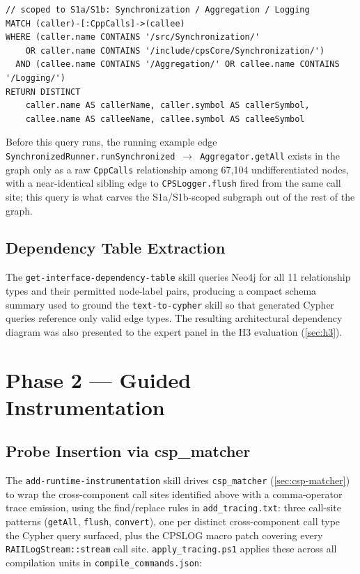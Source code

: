 \begin{verbatim}
// scoped to S1a/S1b: Synchronization / Aggregation / Logging
MATCH (caller)-[:CppCalls]->(callee)
WHERE (caller.name CONTAINS '/src/Synchronization/'
    OR caller.name CONTAINS '/include/cpsCore/Synchronization/')
  AND (callee.name CONTAINS '/Aggregation/' OR callee.name CONTAINS '/Logging/')
RETURN DISTINCT
    caller.name AS callerName, caller.symbol AS callerSymbol,
    callee.name AS calleeName, callee.symbol AS calleeSymbol
\end{verbatim}

Before this query runs, the running example edge
\texttt{SynchronizedRunner.runSynchronized}~$\to$~\texttt{Aggregator.getAll}
exists in the graph only as a raw \texttt{CppCalls} relationship among
67,104 undifferentiated nodes, with a near-identical sibling edge to
\texttt{CPSLogger.flush} fired from the same call site; this query is
what carves the S1a/S1b-scoped subgraph out of the rest of the graph.

\subsection{Dependency Table Extraction}\label{sec:idt}

The \texttt{get-interface-dependency-table} skill queries Neo4j for all
11 relationship types and their permitted node-label pairs, producing a
compact schema summary used to ground the \texttt{text-to-cypher} skill
so that generated Cypher queries reference only valid edge types. The
resulting architectural dependency diagram was also presented to the
expert panel in the H3 evaluation (\cref{sec:h3}).

\section{Phase 2 --- Guided Instrumentation}\label{sec:trace-impl}

\subsection{Probe Insertion via csp\_matcher}\label{sec:trace-probe-insertion}

The \texttt{add-runtime-instrumentation} skill drives \texttt{csp\_matcher}
(\cref{sec:csp-matcher}) to wrap the cross-component call sites
identified above with a comma-operator trace emission, using the
find/replace rules in \texttt{add\_tracing.txt}: three call-site
patterns (\texttt{getAll}, \texttt{flush}, \texttt{convert}), one per
distinct cross-component call type the Cypher query surfaced, plus the
CPSLOG macro patch covering every \texttt{RAIILogStream::stream} call
site. \texttt{apply\_tracing.ps1} applies these across all compilation
units in \texttt{compile\_commands.json}:

